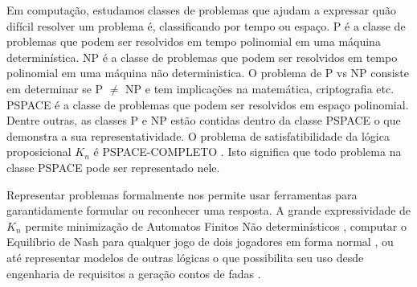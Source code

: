 



Em computação, estudamos classes de problemas que ajudam a expressar quão difícil resolver um problema é, classificando por tempo ou espaço. P é a classe de problemas que podem ser resolvidos em tempo polinomial em uma máquina determinística. NP é a classe de problemas que podem ser resolvidos em tempo polinomial em uma máquina não deterministica. O problema de P vs NP consiste em determinar se P $\not=$ NP e tem implicações na matemática, criptografia etc. PSPACE é a classe de problemas que podem ser resolvidos em espaço polinomial. Dentre outras, as classes P e NP estão contidas dentro da classe PSPACE o que demonstra a sua representatividade. %
O problema de satisfatibilidade da lógica proposicional $K_n$ é PSPACE-COMPLETO \cite{Ladner77}. Isto significa que todo problema na classe PSPACE pode ser representado nele.


Representar problemas formalmente nos permite usar ferramentas para garantidamente formular ou reconhecer uma resposta. %
A grande expressividade de $K_n$ permite minimização de Automatos Finitos Não determinísticos \cite{nfahard}, computar o Equilíbrio de Nash para qualquer jogo de dois jogadores em forma normal \cite{nashpspace}, ou até representar modelos de outras lógicas \cite{correspkn} o que possibilita seu uso desde engenharia de requisitos \cite{reqeng} a geração contos de fadas \cite{fairytale}.

